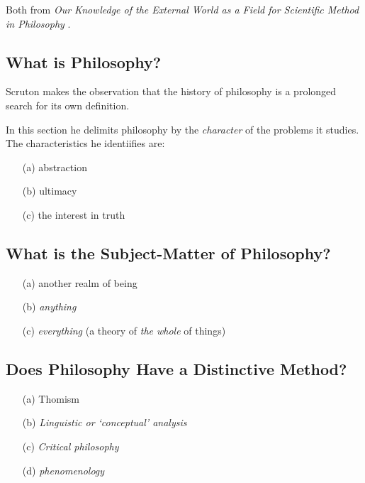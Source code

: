 \documentclass[10pt,titlepage]{article}
\begin{document}
Both from {\it Our Knowledge of the External World as a Field for Scientific Method in Philosophy} \cite{russell21}.

\subsection{What is Philosophy?}

Scruton makes the observation that the history of philosophy is a prolonged search for its own definition.

In this section he delimits philosophy by the {\it character} of the problems it studies.
The characteristics he identiifies are:

\begin{itemize}

\item[(a)] abstraction
  
\item[(b)] ultimacy
  
\item[(c)] the interest in truth
  
\end{itemize}

\subsection{What is the Subject-Matter of Philosophy?}

\begin{itemize}

\item[(a)] another realm of being
  
\item[(b)] {\it anything}
  
\item[(c)] {\it everything} (a theory of {\it the whole} of things)
  
\end{itemize}

\subsection{Does Philosophy Have a Distinctive Method?}

\begin{itemize}

\item[(a)] Thomism
  
\item[(b)] {\it Linguistic or `conceptual' analysis}
  
\item[(c)] {\it Critical philosophy}
  
\item[(d)] {\it phenomenology}

\end{itemize}
\end{document}
